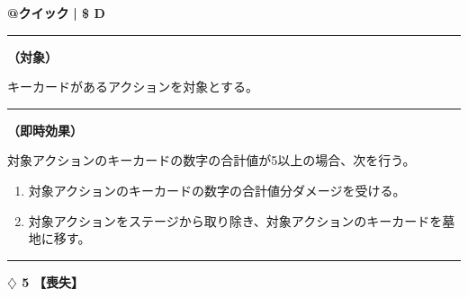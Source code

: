 \documentclass[twocolumn,a5paper,papersize,10pt]{jarticle}
\begin{document}
\begin{tcolorbox}[title={\small\bf【Action】相殺}{\scriptsize （速攻魔法）}]

{\scriptsize\bf @クイック }
  {\scriptsize\bf | \$ D }

\vspace{1mm} %
\hrule height 0.1mm depth 0mm width 62mm %
\vspace{1mm} %

{\bf（対象）}

キーカードがあるアクションを対象とする。

\vspace{1mm} %
\hrule height 0.1mm depth 0mm width 62mm %
\vspace{1mm} %

{\bf（即時効果）}

対象アクションのキーカードの数字の合計値が5以上の場合、次を行う。


\vspace{-1zh}%
\begin{enumerate}
\setlength{\leftskip}{-0.3cm}
\setlength{\parskip}{0pt} %

\item 対象アクションのキーカードの数字の合計値分ダメージを受ける。

\item 対象アクションをステージから取り除き、対象アクションのキーカードを墓地に移す。
\vspace{-1zh}%
\end{enumerate}

\vspace{1mm} %
\end{tcolorbox}

\vspace{-1zh}

 
 
 
 
 

\vspace{3mm} %
\hrule height 0.5mm depth 0mm width 66.5mm %
\vspace{1mm} %
{\Large\bf $\diamondsuit$ 5} {\normalsize\bf【喪失】} %
\vspace{1mm} %
\end{document}
